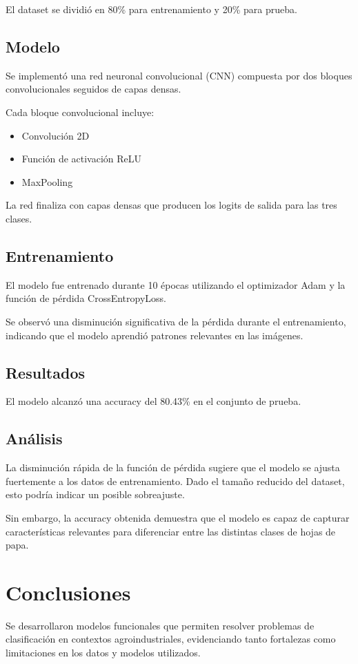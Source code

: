 \documentclass{article}
\begin{document}
El dataset se dividió en 80\% para entrenamiento y 20\% para prueba.

\subsection{Modelo}

Se implementó una red neuronal convolucional (CNN) compuesta por dos bloques convolucionales seguidos de capas densas.

Cada bloque convolucional incluye:

\begin{itemize}
    \item Convolución 2D
    \item Función de activación ReLU
    \item MaxPooling
\end{itemize}

La red finaliza con capas densas que producen los logits de salida para las tres clases.

\subsection{Entrenamiento}

El modelo fue entrenado durante 10 épocas utilizando el optimizador Adam y la función de pérdida CrossEntropyLoss.

Se observó una disminución significativa de la pérdida durante el entrenamiento, indicando que el modelo aprendió patrones relevantes en las imágenes.

\subsection{Resultados}

El modelo alcanzó una accuracy del 80.43\% en el conjunto de prueba.

\subsection{Análisis}

La disminución rápida de la función de pérdida sugiere que el modelo se ajusta fuertemente a los datos de entrenamiento. Dado el tamaño reducido del dataset, esto podría indicar un posible sobreajuste.

Sin embargo, la accuracy obtenida demuestra que el modelo es capaz de capturar características relevantes para diferenciar entre las distintas clases de hojas de papa.

\section{Conclusiones}

Se desarrollaron modelos funcionales que permiten resolver problemas de clasificación en contextos agroindustriales, evidenciando tanto fortalezas como limitaciones en los datos y modelos utilizados.
\end{document}
